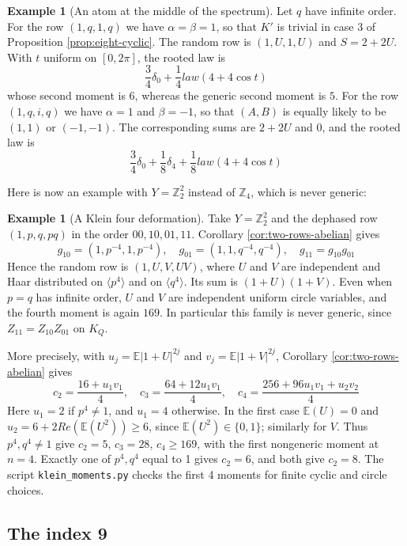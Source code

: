 \documentclass[11pt,reqno]{amsart}
\theoremstyle{definition}
\newtheorem{example}[thm]{Example}
\numberwithin{equation}{section}
\begin{document}
\begin{example}[An atom at the middle of the spectrum]
Let $q$ have infinite order. For the row $(1,q,1,q)$ we have $\alpha=\beta=1$, so that $K'$ is trivial in case 3 of Proposition \ref{prop:eight-cyclic}. The random row is $(1,U,1,U)$ and $S=2+2U$. With $t$ uniform on $[0,2\pi]$, the rooted law is
$$\frac34\delta_0+\frac14 law(4+4\cos t)$$
whose second moment is $6$, whereas the generic second moment is $5$. For the row $(1,q,i,q)$ we have $\alpha=1$ and $\beta=-1$, so that $(A,B)$ is equally likely to be $(1,1)$ or $(-1,-1)$. The corresponding sums are $2+2U$ and $0$, and the rooted law is
$$\frac34\delta_0+\frac18\delta_4+\frac18 law(4+4\cos t)$$
\end{example}

Here is now an example with $Y=\mathbb Z_2^2$ instead of $\mathbb Z_4$, which is never generic:

\begin{example}[A Klein four deformation]
Take $Y=\mathbb Z_2^2$ and the dephased row $(1,p,q,pq)$ in the order $00,10,01,11$. Corollary \ref{cor:two-rows-abelian} gives
$$g_{10}=(1,p^{-4},1,p^{-4}),\quad
g_{01}=(1,1,q^{-4},q^{-4}),\quad g_{11}=g_{10}g_{01}$$
Hence the random row is $(1,U,V,UV)$, where $U$ and $V$ are independent and Haar distributed on $\langle p^4\rangle$ and on $\langle q^4\rangle$. Its sum is $(1+U)(1+V)$. Even when $p=q$ has infinite order, $U$ and $V$ are independent uniform circle variables, and the fourth moment is again $169$. In particular this family is never generic, since $Z_{11}=Z_{10}Z_{01}$ on $K_Q$.

More precisely, with $u_j=\mathbb E|1+U|^{2j}$ and $v_j=\mathbb E|1+V|^{2j}$, Corollary \ref{cor:two-rows-abelian} gives
$$c_2=\frac{16+u_1v_1}4,\quad c_3=\frac{64+12u_1v_1}4,\quad c_4=\frac{256+96u_1v_1+u_2v_2}4$$
Here $u_1=2$ if $p^4\neq1$, and $u_1=4$ otherwise. In the first case $\mathbb E(U)=0$ and $u_2=6+2Re(\mathbb E(U^2))\geq6$, since $\mathbb E(U^2)\in\{0,1\}$; similarly for $V$. Thus $p^4,q^4\neq1$ give $c_2=5$, $c_3=28$, $c_4\geq169$, with the first nongeneric moment at $n=4$. Exactly one of $p^4,q^4$ equal to 1 gives $c_2=6$, and both give $c_2=8$. The script \texttt{klein\_moments.py} checks the first 4 moments for finite cyclic and circle choices.
\end{example}

\subsection{The index 9}
\end{document}
